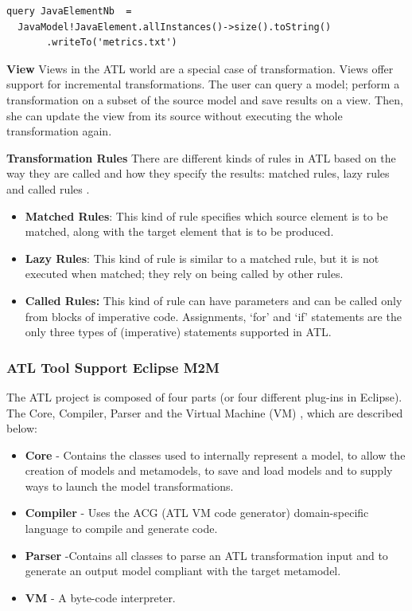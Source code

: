 \vspace{\baselineskip}
\begin{lstlisting}[style=umplePlain]
query JavaElementNb  =
  JavaModel!JavaElement.allInstances()->size().toString()
       .writeTo('metrics.txt')
\end{lstlisting}


\textbf{View}
Views in the ATL world are a special case of transformation. Views offer support for incremental transformations. The user can query a model; perform a transformation on a subset of the source model and save results on a view. Then, she can update the view from its source without executing the whole transformation again. 

\textbf{Transformation Rules}
There are different kinds of rules in ATL based on the way they are called and how they specify the results: matched rules, lazy rules and called rules \cite{stephan2009comparative}.

\begin{itemize}
\item \textbf{Matched Rules}: 	This kind of rule specifies which source element is to be matched, along with the target element that is to be produced.

\item \textbf{Lazy Rules}: This kind of rule is similar to a matched rule, but it is not executed when matched; they rely on being called by other rules.

\item \textbf{Called Rules:}	This kind of rule can have parameters and can be called only from blocks of imperative code. Assignments, `for' and `if' statements are the only three types of (imperative) statements supported in ATL.

\end{itemize}

\subsubsection{ATL Tool Support \textemdash Eclipse M2M}

The ATL project is composed of four parts (or four different plug-ins in Eclipse). The Core, Compiler, Parser and the Virtual Machine (VM) \cite{Jouault200831}, which are described below:

\begin{itemize}
\item \textbf{Core} - Contains the classes used to internally represent a model, to allow the creation of models and metamodels, to save and load models and to supply ways to launch the model transformations. 
\item \textbf{Compiler} - Uses the ACG (ATL VM code generator) domain-specific language to compile and generate code. 
\item \textbf{Parser} -Contains all classes to parse an ATL transformation input and to generate an output model compliant with the target metamodel.
\item \textbf{VM} - A byte-code interpreter.
\end{itemize}

